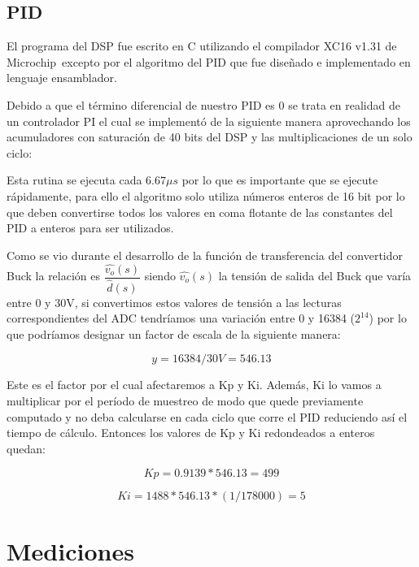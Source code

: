 \documentclass[12pt]{report}
\begin{document}
\section{PID}

El programa del DSP fue escrito en C utilizando el compilador XC16 v1.31 de Microchip\textregistered \ excepto por el algoritmo del PID que fue diseñado e implementado en lenguaje ensamblador. 

Debido a que el término diferencial de nuestro PID es 0 se trata en realidad de un controlador PI el cual se implementó de la siguiente manera aprovechando los acumuladores con saturación de 40 bits del DSP y las multiplicaciones de un solo ciclo:



Esta rutina se ejecuta cada $6.67\mu s$ por lo que es importante que se ejecute rápidamente, para ello el algoritmo solo utiliza números enteros de 16 bit por lo que deben convertirse todos los valores en coma flotante de las constantes del PID a enteros para ser utilizados.

Como se vio durante el desarrollo de la función de transferencia del convertidor Buck la relación es $\dfrac{\hat{v_o}(s)}{\hat{d}(s)}$ siendo $\hat{v_o}(s)$ la tensión de salida del Buck que varía entre 0 y 30V, si convertimos estos valores de tensión a las lecturas correspondientes del ADC tendríamos una variación entre 0 y 16384 ($2^{14}$) por lo que podríamos designar un factor de escala de la siguiente manera:

\begin{equation}
	y = 16384 / 30V = 546.13
\end{equation}

Este es el factor por el cual afectaremos a Kp y Ki. Además, Ki lo vamos a multiplicar por el período de muestreo de modo que quede previamente computado y no deba calcularse en cada ciclo que corre el PID reduciendo así el tiempo de cálculo. Entonces los valores de Kp y Ki redondeados a enteros quedan:

\begin{equation}
	Kp = 0.9139 * 546.13 = 499
\end{equation}

\begin{equation}
	Ki = 1488 * 546.13 * (1/178000) = 5
\end{equation}

\chapter{Mediciones}
\end{document}
